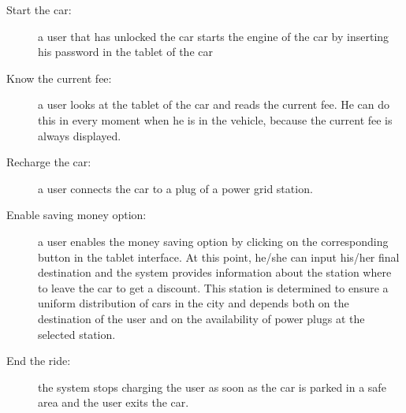 \begin{description}
\item[Start the car:] a user that has unlocked the car starts the engine of the car by inserting his password in the tablet of the car
\item[Know the current fee:] a user looks at the tablet of the car and reads the current fee. He can do this in every moment when he is in the vehicle, because the current fee is always displayed.
\item[Recharge the car:] a user connects the car to a plug of a power grid station.
\item[Enable saving money option:] a user enables the money saving option by clicking on the corresponding button in the tablet interface. At this point, he/she can input his/her final destination and the system provides information about the station where to leave the car to get a discount.
This station is determined to ensure a uniform distribution of cars in the city and depends both on the destination of the user and on the availability of power plugs at the selected station. 
\item[End the ride:] the system stops charging the user as soon as the car is parked in a safe area and the user 
exits the car.
\end{description}
